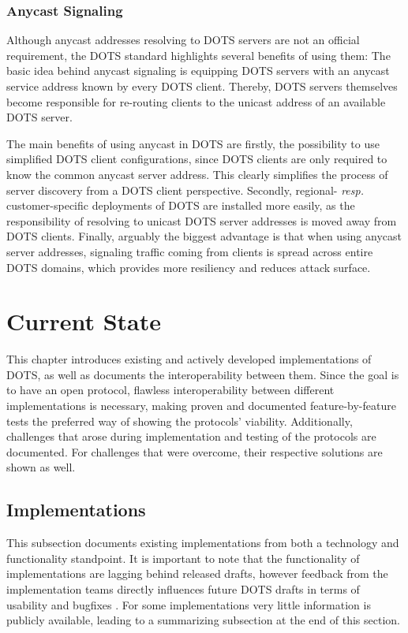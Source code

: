 \subsubsection{Anycast Signaling}
Although anycast addresses resolving to DOTS servers are not an official requirement, the DOTS standard highlights several benefits of using them: The basic idea behind anycast signaling is equipping DOTS servers with an anycast service address known by every DOTS client. Thereby, DOTS servers themselves become responsible for re-routing clients to the unicast address of an available DOTS server. 

The main benefits of using anycast in DOTS are firstly, the possibility to use simplified DOTS client configurations, since DOTS clients are only required to know the common anycast server address. This clearly simplifies the process of server discovery from a DOTS client perspective. Secondly, regional- \emph{resp.} customer-specific deployments of DOTS are installed more easily, as the responsibility of resolving to unicast DOTS server addresses is moved away from DOTS clients. Finally, arguably the biggest advantage is that when using anycast server addresses, signaling traffic coming from clients is spread across entire DOTS domains, which provides more resiliency and reduces attack surface.


\section{Current State}

This chapter introduces existing and actively developed implementations of DOTS, as well as documents the interoperability between them. Since the goal is to have an open protocol, flawless interoperability between different implementations is necessary, making proven and documented feature-by-feature tests the preferred way of showing the protocols' viability. Additionally, challenges that arose during implementation and testing of the protocols are documented. For challenges that were overcome, their respective solutions are shown as well.

\subsection{Implementations}
This subsection documents existing implementations from both a technology and functionality standpoint. It is important to note that the functionality of implementations are lagging behind released drafts, however feedback from the implementation teams directly influences future DOTS drafts in terms of usability and bugfixes \cite{interop-100}. For some implementations very little information is publicly available, leading to a summarizing subsection at the end of this section.

